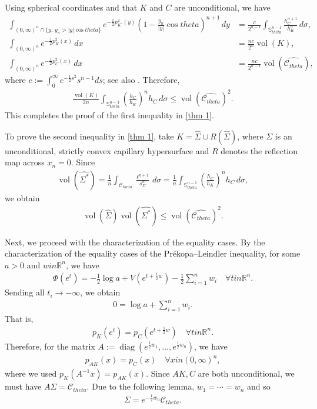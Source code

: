 \documentclass[12pt]{amsart}
\def\theta{theta}%
\def\in{in }%
\numberwithin{equation}{section}
\newcommand{\bbR}{\mathbb{R}}
\newcommand{\8}{\infty}
\newcommand{\si}{\sigma}
\newcommand{\Si}{\Sigma}
\newcommand{\cC}{\mathcal{C}}
\DeclareMathOperator{\vol}{vol}
\renewcommand{\(}{\left(}
\renewcommand{\)}{\right)}
\newcommand{\eq}[1]{\begin{equation}\begin{alignedat}{2} #1 \end{alignedat}\end{equation}}
\newcommand{\q}{\quad}
\begin{document}
Using spherical coordinates and that $K$ and $C$ are unconditional, we have
\eq{
\int_{(0,\infty)^n \cap \{ y :\, y_n > |y| \cos \theta \}} e^{-\frac{1}{2} p_{K^{\circ}}^2(y)} \left( 1 - \frac{y_n}{|y|} \cos \theta \right)^{n+1} \, dy &= \frac{c}{2^{n-1}} \int_{\mathbb{S}_{\theta}^{n-1}} \frac{h_C^{n+1}}{h_K^n}\, d\si, \\
\int_{(0,\infty)^n} e^{-\frac{1}{2} p_K^2(x)}\, dx &= \frac{n c}{2^n} \vol(K), \\
\int_{(0,\infty)^n} e^{-\frac{1}{2} p_C^2(x)}\, dx &= \frac{n c}{2^{n-1}} \vol(\widehat{\mathcal{C}_{\theta}}),
}
where $c := \int_0^{\infty} e^{-\frac{1}{2} s^2} s^{n-1} ds$; see also \cite[eq. (1.54)]{Schneider}. Therefore,
\eq{\label{ineq x}
\frac{\vol(K)}{2n} \int_{\mathbb{S}_{\theta}^{n-1}} \left( \frac{h_C}{h_K} \right)^n h_C\, d\si \leq \vol(\widehat{\mathcal{C}_{\theta}})^2.
}
This completes the proof of the first inequality in \autoref{thm 1}.

To prove the second inequality in \autoref{thm 1}, take $K = \widehat{\Sigma} \cup R(\widehat{\Sigma})$, where $\Sigma$ is an unconditional, strictly convex capillary hypersurface and $R$ denotes the reflection map across $x_n = 0$. Since
\eq{
\vol(\widehat{\Sigma^{\ast}}) = \frac{1}{n} \int_{\mathcal{C}_{\theta}} \frac{\ell^{n+1}}{s_{\Sigma}^n}\, d\si = \frac{1}{n} \int_{\mathbb{S}_{\theta}^{n-1}} \left( \frac{h_C}{h_K} \right)^n h_C\, d\si,
}
we obtain
\eq{
\vol(\widehat{\Sigma}) \vol(\widehat{\Sigma^{\ast}}) \leq \vol(\widehat{\mathcal{C}_{\theta}})^2.
}

Next, we proceed with the characterization of the equality cases. By the characterization of the equality cases  of the Pr\'ekopa--Leindler inequality, for some $a>0$ and $w\in \bbR^n$, we have 
\eq{
\Phi(e^t)=-\frac{1}{2}\log a+V(e^{t+\frac{1}{2}w})-\frac{1}{2}\sum_{i=1}^nw_i\q \forall t\in \bbR^n.
}
Sending all $t_i\to -\infty$, we obtain
\eq{
0=\log a+\sum_{i=1}^nw_i.
}
That is,
\eq{
p_K(e^t)=p_C(e^{t+\frac{1}{2}w})\q \forall t\in \bbR^n.
}
Therefore, for the matrix $A:=\operatorname{diag}(e^{\frac{1}{2}w_1},\ldots,e^{\frac{1}{2}w_n})$, we have
\eq{
p_{AK}(x)=p_C(x)\q \forall x\in (0,\infty)^n,
}
where we used $p_K(A^{-1}x)=p_{AK}(x)$. Since $AK,C$ are both unconditional, we must have $A\Si=\cC_{\theta}$. Due to  the following lemma, $w_1=\cdots=w_n$ and so 
\eq{
\Si=e^{-\frac{1}{2}w_n}\cC_{\theta}.
}
\end{document}
